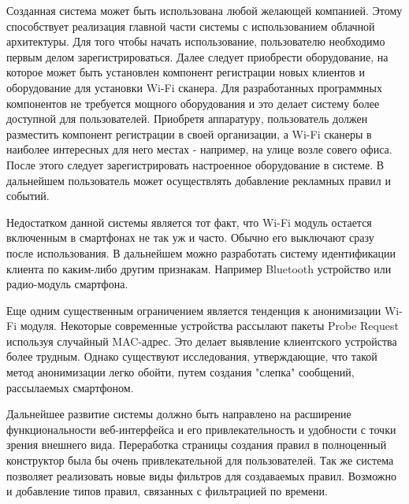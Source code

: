 Созданная система может быть использована любой желающей компанией. Этому способствует реализация главной части системы с использованием облачной архитектуры. Для того чтобы начать использование, пользователю необходимо первым делом зарегистрироваться. Далее следует приобрести оборудование, на которое может быть установлен компонент регистрации новых клиентов и оборудование для установки Wi-Fi сканера. Для разработанных программных компонентов не требуется мощного оборудования и это делает систему более доступной для пользователей. Приобретя аппаратуру, пользователь должен разместить компонент регистрации в своей организации, а Wi-Fi сканеры в наиболее интересных для него местах - например, на улице возле совего офиса. После этого следует зарегистрировать настроенное оборудование в системе. В дальнейшем пользователь может осуществлять добавление рекламных правил и событий.

Недостатком данной системы является тот факт, что Wi-Fi модуль остается включенным в смартфонах не так уж и часто. Обычно его выключают сразу после использования. В дальнейшем можно разработать систему идентификации клиента по каким-либо другим признакам. Например Bluetooth устройство или радио-модуль смартфона.

Еще одним существенным ограничением является тенденция к анонимизации Wi-Fi модуля. Некоторые современные устройства рассылают пакеты Probe Request используя случайный MAC-адрес. Это делает выявление клиентского устройства более трудным. Однако существуют исследования, утверждающие, что такой метод анонимизации легко обойти, путем создания "слепка" сообщений, рассылаемых смартфоном.

Дальнейшее развитие системы должно быть направлено на расширение функциональности веб-интерфейса и его привлекательность и удобности с точки зрения внешнего вида. Переработка страницы создания правил в полноценный конструктор была бы очень привлекательной для пользователей. Так же система позволяет реализовать новые виды фильтров для создаваемых правил. Возможно и добавление типов правил, связанных с фильтрацией по времени. 